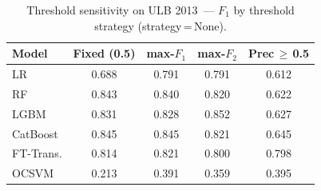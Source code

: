 \begin{table}[ht!]
\centering
\caption{Threshold sensitivity on ULB 2013~--- $F_1$ by threshold strategy (strategy\,=\,None).}
\label{tab:threshold_ulb_f1}
\begin{tabular}{l c c c c}
\toprule
Model & Fixed (0.5) & max-$F_1$ & max-$F_2$ & Prec\,$\geq$\,0.5 \\
\midrule
LR         & 0.688 & 0.791 & 0.791 & 0.612 \\
RF         & 0.843 & 0.840 & 0.820 & 0.622 \\
LGBM       & 0.831 & 0.828 & 0.852 & 0.627 \\
CatBoost   & 0.845 & 0.845 & 0.821 & 0.645 \\
FT-Trans.  & 0.814 & 0.821 & 0.800 & 0.798 \\
OCSVM      & 0.213 & 0.391 & 0.359 & 0.395 \\
\bottomrule
\end{tabular}
\end{table}